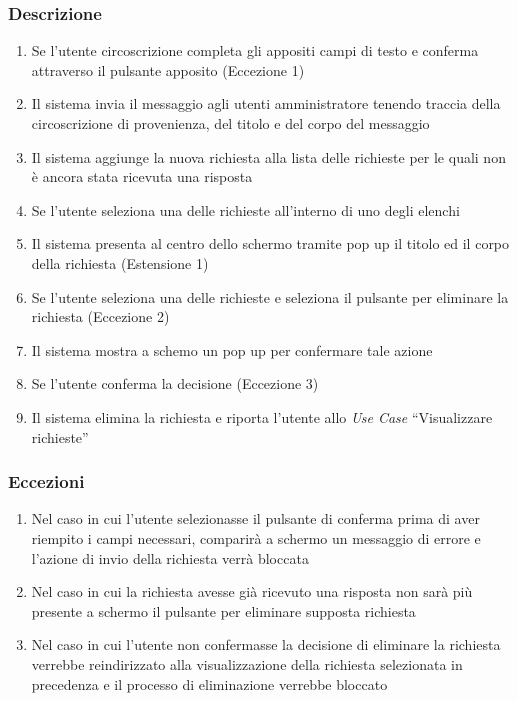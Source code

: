         \subsubsection{Descrizione}
            \begin{enumerate}
                \item Se l'utente circoscrizione completa gli appositi campi di testo e conferma attraverso il pulsante apposito (Eccezione 1)
                \item Il sistema invia il messaggio agli utenti amministratore tenendo traccia della circoscrizione di provenienza, del titolo e del corpo del messaggio
                \item Il sistema aggiunge la nuova richiesta alla lista delle richieste per le quali non è ancora stata ricevuta una risposta
                \item Se l'utente seleziona una delle richieste all'interno di uno degli elenchi
                \item Il sistema presenta al centro dello schermo tramite pop up il titolo ed il corpo della richiesta (Estensione 1)
                \item Se l'utente seleziona una delle richieste e seleziona il pulsante per eliminare la richiesta (Eccezione 2)
                \item Il sistema mostra a schemo un pop up per confermare tale azione
                \item Se l'utente conferma la decisione (Eccezione 3)
                \item Il sistema elimina la richiesta e riporta l'utente allo \textit{Use Case} ``Visualizzare richieste''
            \end{enumerate}
        \subsubsection{Eccezioni}
            \begin{enumerate}
                \item Nel caso in cui l'utente selezionasse il pulsante di conferma prima di aver riempito i campi necessari, comparirà a schermo un messaggio di errore e l'azione di invio della richiesta verrà bloccata
                \item Nel caso in cui la richiesta avesse già ricevuto una risposta non sarà più presente a schermo il pulsante per eliminare supposta richiesta
                \item Nel caso in cui l'utente non confermasse la decisione di eliminare la richiesta verrebbe reindirizzato alla visualizzazione della richiesta selezionata in precedenza e il processo di eliminazione verrebbe bloccato
            \end{enumerate}
